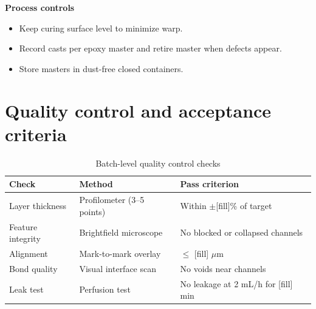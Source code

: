 \textbf{Process controls}
\begin{itemize}
  \item Keep curing surface level to minimize warp.
  \item Record casts per epoxy master and retire master when defects appear.
  \item Store masters in dust-free closed containers.
\end{itemize}

\section{Quality control and acceptance criteria}
\begin{table}[H]
\centering
\caption{Batch-level quality control checks}
\label{tab:fab_qc}
\begin{tabular}{lll}
\hline
\textbf{Check} & \textbf{Method} & \textbf{Pass criterion} \\
\hline
Layer thickness & Profilometer (3--5 points) & Within $\pm$[fill]\% of target \\
Feature integrity & Brightfield microscope & No blocked or collapsed channels \\
Alignment & Mark-to-mark overlay & $\leq$ [fill] $\mu$m \\
Bond quality & Visual interface scan & No voids near channels \\
Leak test & Perfusion test & No leakage at 2 mL/h for [fill] min \\
\hline
\end{tabular}
\end{table}

